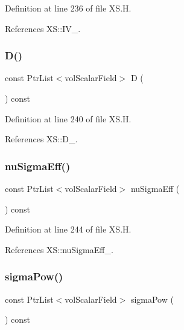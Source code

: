 Definition at line 236 of file X\+S.\+H.



References X\+S\+::\+I\+V\+\_\+.

\mbox{\label{classFoam_1_1XS_a183948adfa6649ba954e96d3ff1fb262}} 
\subsubsection{\texorpdfstring{D()}{D()}}
{\footnotesize\ttfamily const Ptr\+List$<$vol\+Scalar\+Field$>$ D (\begin{DoxyParamCaption}{ }\end{DoxyParamCaption}) const\hspace{0.3cm}{\ttfamily [inline]}}



Definition at line 240 of file X\+S.\+H.



References X\+S\+::\+D\+\_\+.

\mbox{\label{classFoam_1_1XS_a2d54b65ba527abfbece66dee3572e935}} 
\subsubsection{\texorpdfstring{nu\+Sigma\+Eff()}{nuSigmaEff()}}
{\footnotesize\ttfamily const Ptr\+List$<$vol\+Scalar\+Field$>$ nu\+Sigma\+Eff (\begin{DoxyParamCaption}{ }\end{DoxyParamCaption}) const\hspace{0.3cm}{\ttfamily [inline]}}



Definition at line 244 of file X\+S.\+H.



References X\+S\+::nu\+Sigma\+Eff\+\_\+.

\mbox{\label{classFoam_1_1XS_aa3757df4a20f8fb067a76e9acb069849}} 
\subsubsection{\texorpdfstring{sigma\+Pow()}{sigmaPow()}}
{\footnotesize\ttfamily const Ptr\+List$<$vol\+Scalar\+Field$>$ sigma\+Pow (\begin{DoxyParamCaption}{ }\end{DoxyParamCaption}) const\hspace{0.3cm}{\ttfamily [inline]}}



